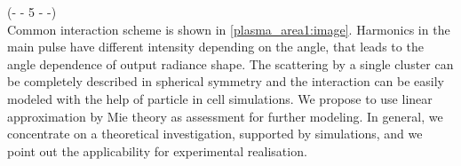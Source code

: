 \noindent(- - 5 - -)\\
Common interaction scheme is shown in \autoref{plasma_area1:image}. Harmonics in the main pulse have different intensity depending on the angle, that leads to the angle dependence of output radiance shape. The scattering by a single cluster can be completely described in spherical symmetry and the interaction can be easily modeled with the help of particle in cell simulations. We propose to use linear approximation by Mie theory as assessment for further modeling. In general, we concentrate on a theoretical investigation, supported by simulations, and we point out the applicability for experimental realisation.

